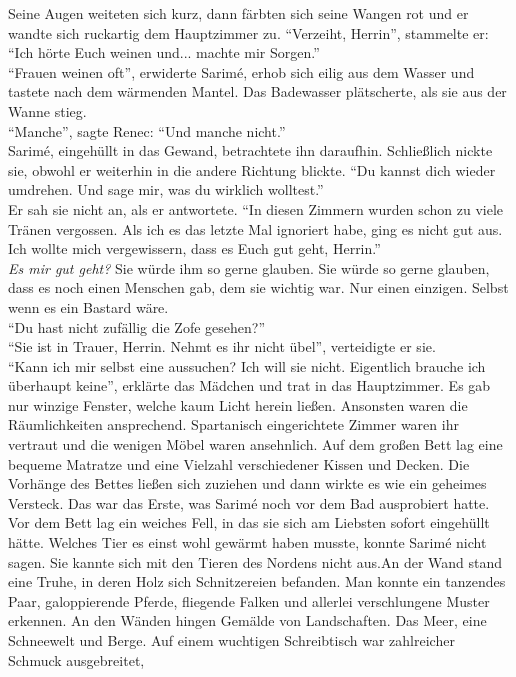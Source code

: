 Seine Augen weiteten sich kurz, dann färbten sich seine Wangen rot und er wandte sich ruckartig dem 
Hauptzimmer zu. ``Verzeiht, Herrin'', stammelte er: ``Ich hörte Euch weinen und... machte mir 
Sorgen.''\\
``Frauen weinen oft'', erwiderte Sarimé, erhob sich eilig aus dem Wasser und tastete nach dem 
wärmenden Mantel. Das Badewasser plätscherte, als sie aus der Wanne stieg.\\
``Manche'', sagte Renec: ``Und manche nicht.''\\
Sarimé, eingehüllt in das Gewand, betrachtete ihn daraufhin. Schließlich nickte sie, obwohl er 
weiterhin in die andere Richtung blickte. ``Du kannst dich wieder umdrehen. Und sage mir, was du 
wirklich wolltest.''\\
Er sah sie nicht an, als er antwortete. ``In diesen Zimmern wurden schon zu viele Tränen vergossen. 
Als ich es das letzte Mal ignoriert habe, ging es nicht gut aus. Ich wollte mich vergewissern, dass 
es Euch gut geht, Herrin.''\\
\textit{Es mir gut geht?} Sie würde ihm so gerne glauben. Sie würde so gerne glauben, dass es noch 
einen Menschen gab, dem sie wichtig war. Nur einen einzigen. Selbst wenn es ein Bastard wäre.\\
``Du hast nicht zufällig die Zofe gesehen?''\\
``Sie ist in Trauer, Herrin. Nehmt es ihr nicht übel'', verteidigte er sie.\\
``Kann ich mir selbst eine aussuchen? Ich will sie nicht. Eigentlich brauche ich überhaupt keine'', 
erklärte das Mädchen und trat in das Hauptzimmer. Es gab nur winzige Fenster, welche kaum Licht 
herein ließen. Ansonsten waren die Räumlichkeiten ansprechend. Spartanisch eingerichtete Zimmer 
waren ihr vertraut und die wenigen Möbel waren ansehnlich. Auf dem großen Bett lag eine bequeme 
Matratze und eine Vielzahl verschiedener Kissen und Decken. Die Vorhänge des Bettes ließen sich 
zuziehen und dann wirkte es wie ein geheimes Versteck. Das war das Erste, was Sarimé noch vor dem 
Bad ausprobiert hatte. Vor dem Bett lag ein weiches Fell, in das sie sich am Liebsten sofort 
eingehüllt hätte. Welches Tier es einst wohl gewärmt haben musste, konnte Sarimé nicht sagen. Sie 
kannte sich mit den Tieren des Nordens nicht aus.An der Wand stand eine Truhe, in deren Holz  sich 
Schnitzereien befanden. Man konnte ein tanzendes Paar, galoppierende Pferde, fliegende Falken und 
allerlei verschlungene Muster erkennen. An den Wänden hingen Gemälde von Landschaften. Das Meer, 
eine Schneewelt und Berge. Auf einem wuchtigen Schreibtisch war zahlreicher Schmuck ausgebreitet, 
